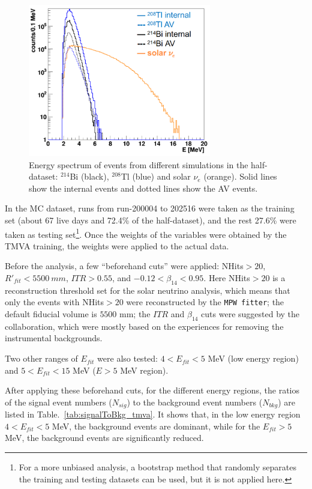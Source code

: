 \begin{figure}[!htb]
	\centering
	\includegraphics[width=8cm]{TMVA_bkgs_1.png}
	\caption[Energy spectrum of events from different simulations.]{Energy spectrum of events from different simulations in the half-dataset: $^{214}$Bi (black), $^{208}$Tl (blue) and solar $\nu_e$ (orange). Solid lines show the internal events and dotted lines show the AV events.}
	\label{TMVA_bkgs_1}
\end{figure}

In the MC dataset, runs from run-200004 to 202516 were taken as the training set (about 67 live days and 72.4\% of the half-dataset), and the rest 27.6\% were taken as testing set\footnote{For a more unbiased analysis, a bootstrap method\cite{murphy2012machine} that randomly separates the training and testing datasets can be used, but it is not applied here.}. Once the weights of the variables were obtained by the TMVA training, the weights were applied to the actual data.

Before the analysis, a few ``beforehand cuts'' were applied: NHits$>20$, $R'_{fit}<5500~mm$, $ITR>0.55$, and $-0.12<\beta_{14}<0.95$. Here NHits$>20$ is a reconstruction threshold set for the solar neutrino analysis, which means that only the events with NHits$>20$ were reconstructed by the \texttt{MPW fitter}; the default fiducial volume is $5500$ mm; the $ITR$ and $\beta_{14}$ cuts were suggested by the collaboration, which were mostly based on the experiences for removing the instrumental backgrounds\cite{waterunidoc}. 

Two other ranges of $E_{fit}$ were also tested: $4<E_{fit}<5$ MeV (low energy region) and $5<E_{fit}<15$ MeV ($E>5$ MeV region). 

After applying these beforehand cuts, for the different energy regions, the ratios of the signal event numbers ($N_{sig}$) to the background event numbers ($N_{bkg}$) are listed in Table.~\ref{tab:signalToBkg_tmva}. It shows that, in the low energy region $4<E_{fit}<5$ MeV, the background events are dominant, while for the $E_{fit}>5$ MeV, the background events are significantly reduced.

